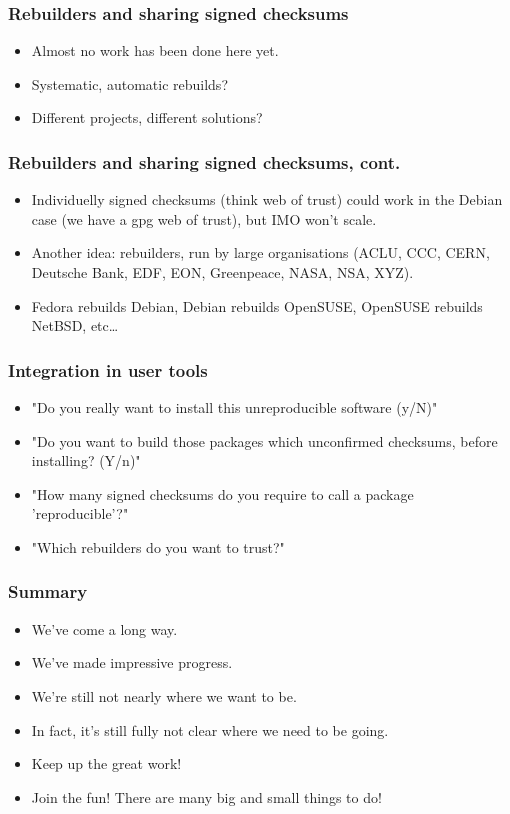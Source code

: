 \documentclass[14pt]{beamer}
\begin{document}
\begin{frame}
 \frametitle{Rebuilders and sharing signed checksums}
 \begin{itemize}
  \item Almost no work has been done here yet.
  \item<2-3> Systematic, automatic rebuilds? 
  \item<3> Different projects, different solutions? 
 \end{itemize}
\end{frame}

\begin{frame}
 \frametitle{Rebuilders and sharing signed checksums, cont.}
 \begin{itemize}
  \item Individuelly signed checksums (think web of trust) could work in the
  Debian case (we have a gpg web of trust), but IMO won't scale.
  \item<2-3> { Another idea: rebuilders, run by large organisations
  (ACLU, CCC, CERN, Deutsche Bank, EDF, EON, Greenpeace, NASA, NSA, XYZ).}
  \item<3> Fedora rebuilds Debian, Debian rebuilds OpenSUSE, OpenSUSE rebuilds
  NetBSD, etc…
 \end{itemize}
\end{frame}


\begin{frame}
 \frametitle{Integration in user tools}
 \begin{itemize}
  \item "Do you really want to install this unreproducible software (y/N)"
  \item<2-4> "Do you want to build those packages which unconfirmed checksums,
  before installing? (Y/n)"
  \item<3-4>{ "How many signed checksums do you require to call a package
  'reproducible'?"}
  \item<4>{ "Which rebuilders do you want to trust?"}
 \end{itemize}
\end{frame}


\begin{frame}
 \frametitle{Summary}
 \begin{itemize}
  \item We've come a long way.
  \item We've made impressive progress.
  \item We're still not nearly where we want to be.
  \item<2-3> In fact, it's still fully not clear where we need to be going.
  \item<3> Keep up the great work!
  \item<3> Join the fun! There are many big and small things to do!
 \end{itemize}
\end{frame}
\end{document}
